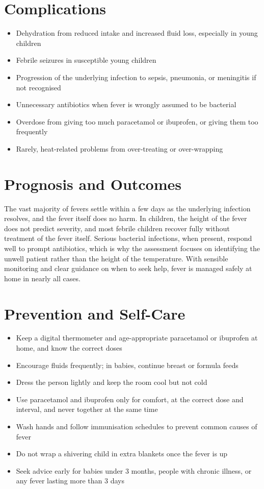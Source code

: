 \section*{Complications}
\begin{itemize}
    \item Dehydration from reduced intake and increased fluid loss, especially in young children
    \item Febrile seizures in susceptible young children
    \item Progression of the underlying infection to sepsis, pneumonia, or meningitis if not recognised
    \item Unnecessary antibiotics when fever is wrongly assumed to be bacterial
    \item Overdose from giving too much paracetamol or ibuprofen, or giving them too frequently
    \item Rarely, heat-related problems from over-treating or over-wrapping
\end{itemize}

\section*{Prognosis and Outcomes}
The vast majority of fevers settle within a few days as the underlying infection resolves, and the fever itself does no harm. In children, the height of the fever does not predict severity, and most febrile children recover fully without treatment of the fever itself. Serious bacterial infections, when present, respond well to prompt antibiotics, which is why the assessment focuses on identifying the unwell patient rather than the height of the temperature. With sensible monitoring and clear guidance on when to seek help, fever is managed safely at home in nearly all cases.

\section*{Prevention and Self-Care}
\begin{itemize}
    \item Keep a digital thermometer and age-appropriate paracetamol or ibuprofen at home, and know the correct doses
    \item Encourage fluids frequently; in babies, continue breast or formula feeds
    \item Dress the person lightly and keep the room cool but not cold
    \item Use paracetamol and ibuprofen only for comfort, at the correct dose and interval, and never together at the same time
    \item Wash hands and follow immunisation schedules to prevent common causes of fever
    \item Do not wrap a shivering child in extra blankets once the fever is up
    \item Seek advice early for babies under 3 months, people with chronic illness, or any fever lasting more than 3 days
\end{itemize}

